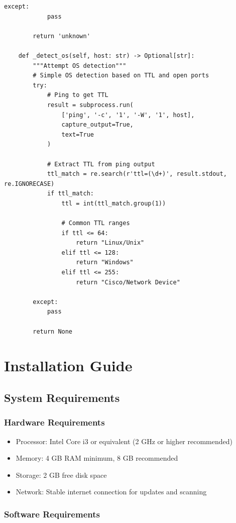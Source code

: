 \documentclass[12pt,a4paper]{report}
\begin{document}
\begin{lstlisting}[caption=Network Scanner Source Code]
        except:
            pass
        
        return 'unknown'
    
    def _detect_os(self, host: str) -> Optional[str]:
        """Attempt OS detection"""
        # Simple OS detection based on TTL and open ports
        try:
            # Ping to get TTL
            result = subprocess.run(
                ['ping', '-c', '1', '-W', '1', host],
                capture_output=True,
                text=True
            )
            
            # Extract TTL from ping output
            ttl_match = re.search(r'ttl=(\d+)', result.stdout, re.IGNORECASE)
            if ttl_match:
                ttl = int(ttl_match.group(1))
                
                # Common TTL ranges
                if ttl <= 64:
                    return "Linux/Unix"
                elif ttl <= 128:
                    return "Windows"
                elif ttl <= 255:
                    return "Cisco/Network Device"
                
        except:
            pass
        
        return None
\end{lstlisting}

\chapter{Installation Guide}

\section{System Requirements}

\subsection{Hardware Requirements}

\begin{itemize}
    \item Processor: Intel Core i3 or equivalent (2 GHz or higher recommended)
    \item Memory: 4 GB RAM minimum, 8 GB recommended
    \item Storage: 2 GB free disk space
    \item Network: Stable internet connection for updates and scanning
\end{itemize}

\subsection{Software Requirements}
\end{document}
